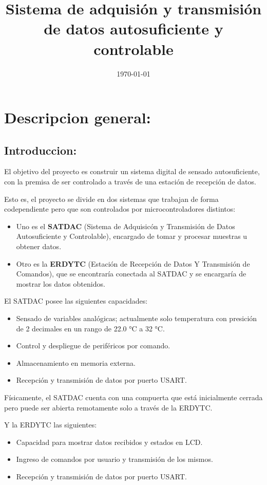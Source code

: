 \documentclass[conference]{IEEEtran}
\date{\today}
\title{Sistema de adquisión y transmisión de datos autosuficiente y controlable}
\begin{document}
\maketitle
\tableofcontents


\section{Descripcion general:}
\label{sec:orgfd88c17}
\subsection{Introduccion:}
\label{sec:orgbe44fea}
El objetivo del proyecto es construir un sistema digital de sensado autosuficiente, con la premisa de ser controlado a través de una estación de recepción de datos.

Esto es, el proyecto se divide en dos sistemas que trabajan de forma codependiente pero que son controlados por microcontroladores distintos:

\begin{itemize}
\item Uno es el \textbf{SATDAC} (Sistema de Adquisicón y Transmisión de Datos Autosuficiente y Controlable), encargado de tomar y procesar muestras u obtener datos.
\item Otro es la \textbf{ERDYTC} (Estación de Recepción de Datos Y Transmisión de Comandos), que se encontraría conectada al SATDAC y se encargaría de mostrar los datos obtenidos.
\end{itemize}

El SATDAC posee las siguientes capacidades:

\begin{itemize}
\item Sensado de variables analógicas; actualmente solo temperatura con presición de 2 decimales en un rango de 22.0 °C a 32 °C.
\item Control y despliegue de periféricos por comando.
\item Almacenamiento en memoria externa.
\item Recepción y transmisión de datos por puerto USART.
\end{itemize}

Físicamente, el SATDAC cuenta con una compuerta que está inicialmente cerrada pero puede ser abierta remotamente solo a través de la ERDYTC.

Y la ERDYTC las siguientes:

\begin{itemize}
\item Capacidad para mostrar datos recibidos y estados en LCD.
\item Ingreso de comandos por usuario y transmisión de los mismos.
\item Recepción y transmisión de datos por puerto USART.
\end{itemize}
\end{document}
